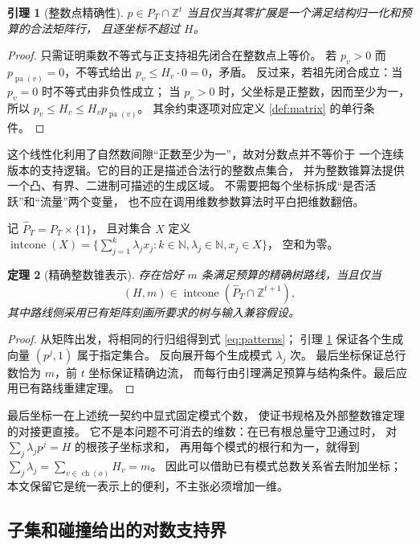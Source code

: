 \documentclass[UTF8,a4paper,11pt,fontset=fandol]{ctexart}
\newtheorem{theorem}{定理}[section]
\newtheorem{lemma}[theorem]{引理}
\theoremstyle{definition}
\newcommand{\N}{\mathbb N}
\newcommand{\Z}{\mathbb Z}
\newcommand{\ic}{\operatorname{intcone}}
\newcommand{\parv}{\operatorname{pa}}
\newcommand{\ch}{\operatorname{ch}}
\begin{document}
\begin{lemma}[整数点精确性]\label{lem:integerpoints}
$p\in P_T\cap\Z^t$ 当且仅当其零扩展是一个满足结构归一化和预算的合法矩阵行，
且逐坐标不超过 $H$。
\end{lemma}
\begin{proof}
只需证明乘数不等式与正支持祖先闭合在整数点上等价。
若 $p_v>0$ 而 $p_{\parv(v)}=0$，不等式给出
$p_v\le H_v\cdot0=0$，矛盾。
反过来，若祖先闭合成立：当 $p_v=0$ 时不等式由非负性成立；
当 $p_v>0$ 时，父坐标是正整数，因而至少为一，
所以 $p_v\le H_v\le H_vp_{\parv(v)}$。
其余约束逐项对应定义 \ref{def:matrix} 的单行条件。
\end{proof}

这个线性化利用了自然数间隙“正数至少为一”，故对分数点并不等价于
一个连续版本的支持逻辑。它的目的正是描述合法行的整数点集合，
并为整数锥算法提供一个凸、有界、二进制可描述的生成区域。
不需要把每个坐标拆成“是否活跃”和“流量”两个变量，
也不应在调用维数参数算法时平白把维数翻倍。

记 $\widehat P_T=P_T\times\{1\}$，
且对集合 $X$ 定义
$\ic(X)=\{\sum_{j=1}^k\lambda_jx_j:
k\in\N,\lambda_j\in\N,x_j\in X\}$，
空和为零。
\begin{theorem}[精确整数锥表示]\label{thm:intcone}
存在恰好 $m$ 条满足预算的精确树路线，当且仅当
\begin{equation}\label{eq:intcone}
(H,m)\in\ic(\widehat P_T\cap\Z^{t+1}),
\end{equation}
其中路线侧采用已有矩阵刻画所要求的树与输入兼容假设。
\end{theorem}
\begin{proof}
从矩阵出发，将相同的行归组得到式 \eqref{eq:patterns}；
引理 \ref{lem:integerpoints} 保证各个生成向量 $(p^j,1)$ 属于指定集合。
反向展开每个生成模式 $\lambda_j$ 次。
最后坐标保证总行数恰为 $m$，前 $t$ 坐标保证精确边流，
而每行由引理满足预算与结构条件。最后应用已有路线重建定理。
\end{proof}

最后坐标一在上述统一契约中显式固定模式个数，
使证书规格及外部整数锥定理的对接更直接。
它不是本问题不可消去的维数：在已有根总量守卫通过时，
对 $\sum_j\lambda_jp^j=H$ 的根孩子坐标求和，
再用每个模式的根行和为一，就得到
$\sum_j\lambda_j=\sum_{v\in\ch(o)}H_v=m$。
因此可以借助已有模式总数关系省去附加坐标；
本文保留它是统一表示上的便利，不主张必须增加一维。

\subsection{子集和碰撞给出的对数支持界}
\end{document}
